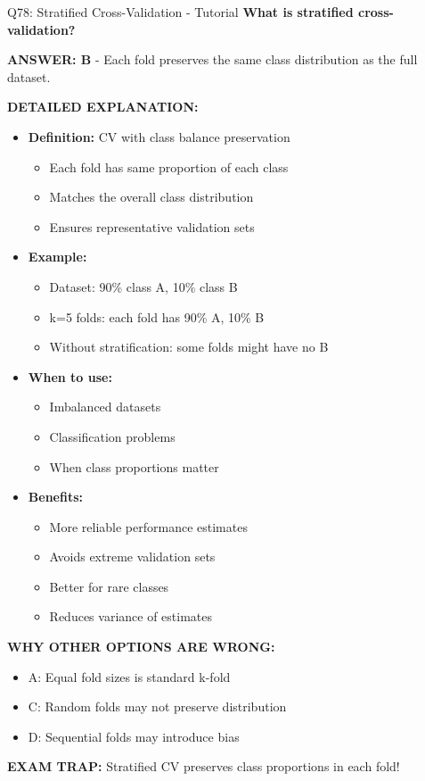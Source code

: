 \documentclass[8pt]{beamer}
\begin{document}
	\begin{frame}{Q78: Stratified Cross-Validation - Tutorial}
		\fontsize{6.5}{7.5}\selectfont
		\textbf{What is stratified cross-validation?}
		
		\vspace{0.05cm}
		\textcolor{myblue}{\textbf{ANSWER: B}} - Each fold preserves the same class distribution as the full dataset.
		
		\vspace{0.05cm}
		\textbf{DETAILED EXPLANATION:}
		\begin{itemize}
			\item \textbf{Definition:} CV with class balance preservation
			\begin{itemize}
				\item Each fold has same proportion of each class
				\item Matches the overall class distribution
				\item Ensures representative validation sets
			\end{itemize}
			\item \textbf{Example:}
			\begin{itemize}
				\item Dataset: 90\% class A, 10\% class B
				\item k=5 folds: each fold has 90\% A, 10\% B
				\item Without stratification: some folds might have no B
			\end{itemize}
			\item \textbf{When to use:}
			\begin{itemize}
				\item Imbalanced datasets
				\item Classification problems
				\item When class proportions matter
			\end{itemize}
			\item \textbf{Benefits:}
			\begin{itemize}
				\item More reliable performance estimates
				\item Avoids extreme validation sets
				\item Better for rare classes
				\item Reduces variance of estimates
			\end{itemize}
		\end{itemize}
		
		\vspace{0.05cm}
		\textcolor{myred}{\textbf{WHY OTHER OPTIONS ARE WRONG:}}
		\begin{itemize}
			\item \textcolor{myred}{A:} Equal fold sizes is standard k-fold
			\item \textcolor{myred}{C:} Random folds may not preserve distribution
			\item \textcolor{myred}{D:} Sequential folds may introduce bias
		\end{itemize}
		
		\textcolor{myred}{\textbf{EXAM TRAP:}} Stratified CV preserves class proportions in each fold!
	\end{frame}
	
\end{document}
